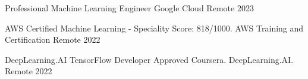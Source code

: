 

\begin{cvhonors}

  \cvhonor
  {Professional Machine Learning Engineer} %
  {Google Cloud} %
  {Remote} %
  {2023} %

  \cvhonor
  {AWS Certified Machine Learning - Speciality} %
  {Score: 818/1000. AWS Training and Certification} %
  {Remote} %
  {2022} %

  \cvhonor
  {DeepLearning.AI TensorFlow Developer} %
  {Approved Coursera. DeepLearning.AI.} %
  {Remote} %
  {2022} %

\end{cvhonors}
